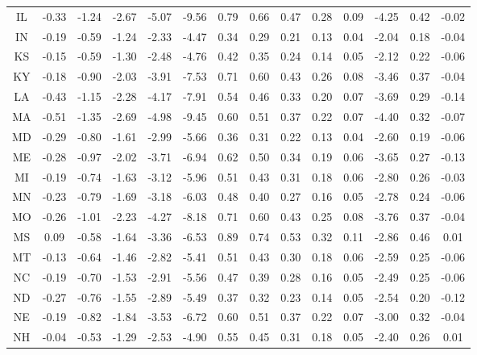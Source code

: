 \begin{table}
\begin{tabular}{cccccccccccccc}
   IL & -0.33 & -1.24 & -2.67 & -5.07 & -9.56 &  0.79 &  0.66 &  0.47 &  0.28 &  0.09 &   -4.25 &     0.42 &     -0.02 \\
   IN & -0.19 & -0.59 & -1.24 & -2.33 & -4.47 &  0.34 &  0.29 &  0.21 &  0.13 &  0.04 &   -2.04 &     0.18 &     -0.04 \\
   KS & -0.15 & -0.59 & -1.30 & -2.48 & -4.76 &  0.42 &  0.35 &  0.24 &  0.14 &  0.05 &   -2.12 &     0.22 &     -0.06 \\
   KY & -0.18 & -0.90 & -2.03 & -3.91 & -7.53 &  0.71 &  0.60 &  0.43 &  0.26 &  0.08 &   -3.46 &     0.37 &     -0.04 \\
   LA & -0.43 & -1.15 & -2.28 & -4.17 & -7.91 &  0.54 &  0.46 &  0.33 &  0.20 &  0.07 &   -3.69 &     0.29 &     -0.14 \\
   MA & -0.51 & -1.35 & -2.69 & -4.98 & -9.45 &  0.60 &  0.51 &  0.37 &  0.22 &  0.07 &   -4.40 &     0.32 &     -0.07 \\
   MD & -0.29 & -0.80 & -1.61 & -2.99 & -5.66 &  0.36 &  0.31 &  0.22 &  0.13 &  0.04 &   -2.60 &     0.19 &     -0.06 \\
   ME & -0.28 & -0.97 & -2.02 & -3.71 & -6.94 &  0.62 &  0.50 &  0.34 &  0.19 &  0.06 &   -3.65 &     0.27 &     -0.13 \\
   MI & -0.19 & -0.74 & -1.63 & -3.12 & -5.96 &  0.51 &  0.43 &  0.31 &  0.18 &  0.06 &   -2.80 &     0.26 &     -0.03 \\
   MN & -0.23 & -0.79 & -1.69 & -3.18 & -6.03 &  0.48 &  0.40 &  0.27 &  0.16 &  0.05 &   -2.78 &     0.24 &     -0.06 \\
   MO & -0.26 & -1.01 & -2.23 & -4.27 & -8.18 &  0.71 &  0.60 &  0.43 &  0.25 &  0.08 &   -3.76 &     0.37 &     -0.04 \\
   MS &  0.09 & -0.58 & -1.64 & -3.36 & -6.53 &  0.89 &  0.74 &  0.53 &  0.32 &  0.11 &   -2.86 &     0.46 &      0.01 \\
   MT & -0.13 & -0.64 & -1.46 & -2.82 & -5.41 &  0.51 &  0.43 &  0.30 &  0.18 &  0.06 &   -2.59 &     0.25 &     -0.06 \\
   NC & -0.19 & -0.70 & -1.53 & -2.91 & -5.56 &  0.47 &  0.39 &  0.28 &  0.16 &  0.05 &   -2.49 &     0.25 &     -0.06 \\
   ND & -0.27 & -0.76 & -1.55 & -2.89 & -5.49 &  0.37 &  0.32 &  0.23 &  0.14 &  0.05 &   -2.54 &     0.20 &     -0.12 \\
   NE & -0.19 & -0.82 & -1.84 & -3.53 & -6.72 &  0.60 &  0.51 &  0.37 &  0.22 &  0.07 &   -3.00 &     0.32 &     -0.04 \\
   NH & -0.04 & -0.53 & -1.29 & -2.53 & -4.90 &  0.55 &  0.45 &  0.31 &  0.18 &  0.05 &   -2.40 &     0.26 &      0.01 \\

\end{tabular}
\end{table}
